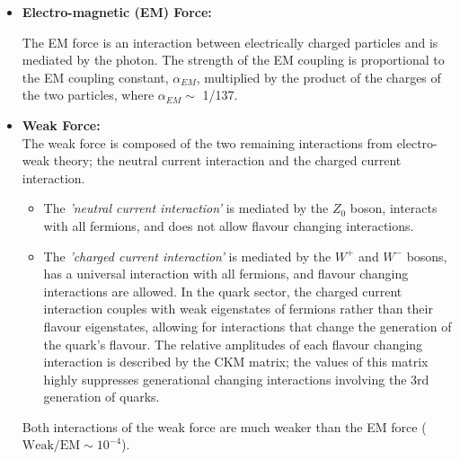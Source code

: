 \begin{itemize}[leftmargin=*]
\item\textbf{Electro-magnetic (EM) Force:}

  The EM force is an interaction between electrically charged particles and is mediated by the photon.
  The strength of the EM coupling is proportional to the EM coupling constant, $\alpha_{EM}$,
  multiplied by the product of the charges of the two particles, where $\alpha_{EM} \sim$ 1/137.\vspace{0.5em} %

\item\textbf{Weak Force:} \\
  The weak force is composed of the two remaining interactions from electro-weak theory;
  the neutral current interaction and the charged current interaction.
  \begin{itemize}[leftmargin=*]  
  \item The \textit{'neutral current interaction'} is mediated by the $Z_0$ boson, interacts with all fermions,
    and does not allow flavour changing interactions.
  \item The \textit{'charged current interaction'} is mediated by the $W^+$ and $W^-$ bosons,
    has a universal interaction with all fermions,
    and flavour changing interactions are allowed.
    In the quark sector, the charged current interaction
    couples with weak eigenstates of fermions rather than their flavour eigenstates,
    allowing for interactions that change the generation of the quark's flavour.
    The relative amplitudes of each flavour changing interaction is described by the CKM matrix;
    the values of this matrix highly suppresses generational changing interactions involving the 3rd generation of quarks.
  \end{itemize}
  Both interactions of the weak force are much weaker than the EM force
  \mbox{($\text{Weak}/\text{EM} \sim 10^{-4}$)}.\vspace{0.5em} %
  

\end{itemize}
